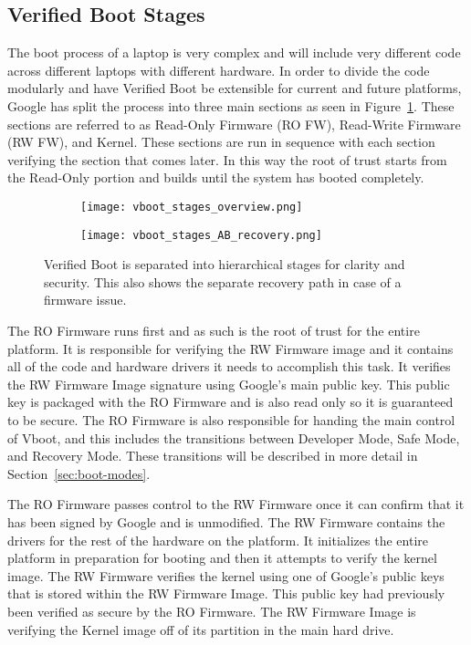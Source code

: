 \documentclass[../report.tex]{subfiles}
\begin{document}
\subsection{Verified Boot Stages}

The boot process of a laptop is very complex and will include very different code across different laptops with different hardware.
In order to divide the code modularly and have Verified Boot be extensible for current and future platforms, Google has split the process into three main sections as seen in Figure~\ref{fig:vboot_stages_overview}.
These sections are referred to as Read-Only Firmware (RO FW), Read-Write Firmware (RW FW), and Kernel.
These sections are run in sequence with each section verifying the section that comes later.
In this way the root of trust starts from the Read-Only portion and builds until the system has booted completely.

\begin{figure}
\begin{subfigure}{.4\textwidth}
  \centering
  \texttt{[image: vboot\_stages\_overview.png]}
\end{subfigure}
\begin{subfigure}{.60\textwidth}
  \centering
  \texttt{[image: vboot\_stages\_AB\_recovery.png]}
\end{subfigure}
\caption{Verified Boot is separated into hierarchical stages for clarity and security. This also shows the separate recovery path in case of a firmware issue.}
\label{fig:vboot_stages_overview}
\end{figure}

The RO Firmware runs first and as such is the root of trust for the entire platform.
It is responsible for verifying the RW Firmware image and it contains all of the code and hardware drivers it needs to accomplish this task.
It verifies the RW Firmware Image signature using Google's main public key.
This public key is packaged with the RO Firmware and is also read only so it is guaranteed to be secure.
The RO Firmware is also responsible for handing the main control of Vboot, and this includes the transitions between Developer Mode, Safe Mode, and Recovery Mode.
These transitions will be described in more detail in Section~\ref{sec:boot-modes}.

The RO Firmware passes control to the RW Firmware once it can confirm that it has been signed by Google and is unmodified.
The RW Firmware contains the drivers for the rest of the hardware on the platform. 
It initializes the entire platform in preparation for booting and then it attempts to verify the kernel image.
The RW Firmware verifies the kernel using one of Google's public keys that is stored within the RW Firmware Image.
This public key had previously been verified as secure by the RO Firmware.
The RW Firmware Image is verifying the Kernel image off of its partition in the main hard drive.
\end{document}
